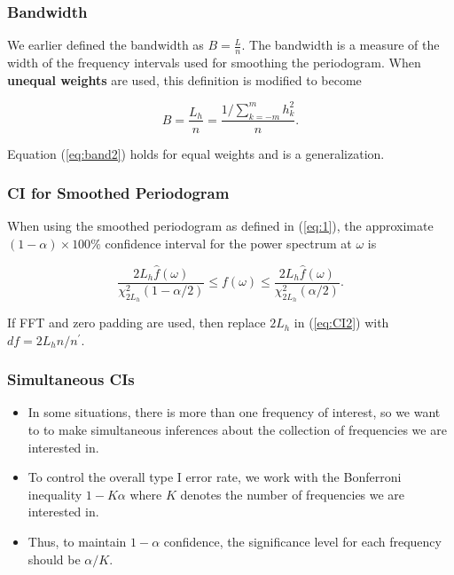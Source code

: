 \documentclass[%
xcolor=pdftex]{beamer}
\begin{document}
\begin{frame}
\frametitle{Bandwidth}

We earlier defined the bandwidth as $B = \frac{L}{n}$. The bandwidth is a measure of the width of the frequency intervals used for smoothing the periodogram. When \textbf{unequal weights} are used, this definition is modified to become

\begin{equation} \label{eq:band2}
B = \frac{L_h}{n} = \frac{1/ \sum_{k=-m}^{m} h_k^2}{n}.
\end{equation}

Equation (\ref{eq:band2}) holds for equal weights and is a generalization.

\end{frame}

\begin{frame}
\frametitle{CI for Smoothed Periodogram}

When using the smoothed periodogram as defined in (\ref{eq:1}), the approximate $(1-\alpha) \times 100\%$ confidence interval for the power spectrum at $\omega$ is

\begin{equation} \label{eq:CI2}
\frac{2 L_h   \widehat{f}(\omega)}{{\chi_{2L_h}^2(1-\alpha/2)}} \leq f(\omega) \leq \frac{2 L_h  \widehat{f}(\omega) }{{\chi_{2L_h}^2(\alpha/2)}} .
\end{equation}

If FFT and zero padding are used, then replace $2 L_h$ in (\ref{eq:CI2}) with $df = 2 L_h n / n^\prime$.

\end{frame}

\begin{frame}
\frametitle{Simultaneous CIs}

\begin{itemize}
\item In some situations, there is more than one frequency of interest, so we want to to make simultaneous inferences about the collection of frequencies we are interested in. 

\item To control the overall type I error rate, we work with the Bonferroni inequality $1 - K \alpha$ where $K$ denotes the number of frequencies we are interested in. 

\item Thus, to maintain $1 - \alpha$ confidence, the significance level for each frequency should be $\alpha/K$. 

\end{itemize}

\end{frame}
\end{document}
